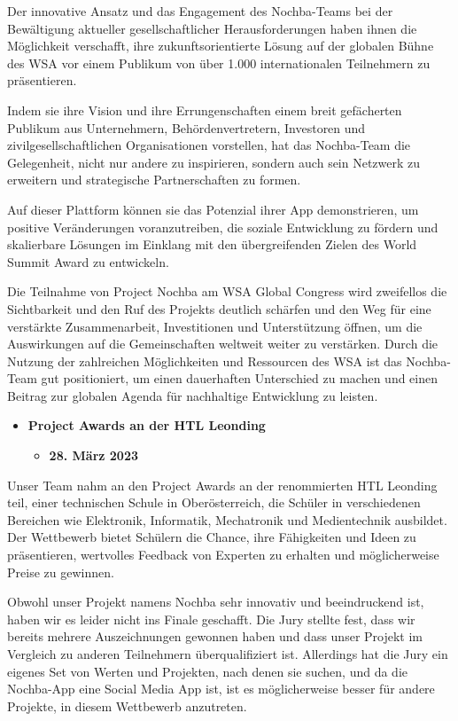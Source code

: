 Der innovative Ansatz und das Engagement des Nochba-Teams bei der Bewältigung aktueller gesellschaftlicher Herausforderungen haben ihnen die Möglichkeit verschafft, ihre zukunftsorientierte Lösung auf der globalen Bühne des WSA vor einem Publikum von über 1.000 internationalen Teilnehmern zu präsentieren.

Indem sie ihre Vision und ihre Errungenschaften einem breit gefächerten Publikum aus Unternehmern, Behördenvertretern, Investoren und zivilgesellschaftlichen Organisationen vorstellen, hat das Nochba-Team die Gelegenheit, nicht nur andere zu inspirieren, sondern auch sein Netzwerk zu erweitern und strategische Partnerschaften zu formen.

Auf dieser Plattform können sie das Potenzial ihrer App demonstrieren, um positive Veränderungen voranzutreiben, die soziale Entwicklung zu fördern und skalierbare Lösungen im Einklang mit den übergreifenden Zielen des World Summit Award zu entwickeln.

Die Teilnahme von Project Nochba am WSA Global Congress wird zweifellos die Sichtbarkeit und den Ruf des Projekts deutlich schärfen und den Weg für eine verstärkte Zusammenarbeit, Investitionen und Unterstützung öffnen, um die Auswirkungen auf die Gemeinschaften weltweit weiter zu verstärken. Durch die Nutzung der zahlreichen Möglichkeiten und Ressourcen des WSA ist das Nochba-Team gut positioniert, um einen dauerhaften Unterschied zu machen und einen Beitrag zur globalen Agenda für nachhaltige Entwicklung zu leisten.

\begin{itemize}
    \item \textbf{Project Awards an der HTL Leonding}
          \begin{itemize}
              \item \textbf{28. März 2023}
          \end{itemize}
\end{itemize}

Unser Team nahm an den Project Awards an der renommierten HTL Leonding teil, einer technischen Schule in Oberösterreich, die Schüler in verschiedenen Bereichen wie Elektronik, Informatik, Mechatronik und Medientechnik ausbildet. Der Wettbewerb bietet Schülern die Chance, ihre Fähigkeiten und Ideen zu präsentieren, wertvolles Feedback von Experten zu erhalten und möglicherweise Preise zu gewinnen.

Obwohl unser Projekt namens Nochba sehr innovativ und beeindruckend ist, haben wir es leider nicht ins Finale geschafft. Die Jury stellte fest, dass wir bereits mehrere Auszeichnungen gewonnen haben und dass unser Projekt im Vergleich zu anderen Teilnehmern überqualifiziert ist. Allerdings hat die Jury ein eigenes Set von Werten und Projekten, nach denen sie suchen, und da die Nochba-App eine Social Media App ist, ist es möglicherweise besser für andere Projekte, in diesem Wettbewerb anzutreten.

